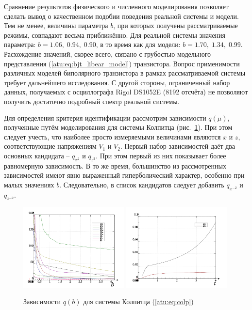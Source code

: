 Сравнение результатов физического и численного моделирования позволяет сделать вывод
о качественном подобии поведения реальной системы и модели.
Тем не менее, величины параметра $b$, при которых получены
рассматриваемые режимы, совпадают весьма приближённо.
Для реальной системы значения параметра: $b = 1.06, \; 0.94, \; 0.90 $, в то время как
для модели: $b = 1.70, \; 1.34, \; 0.99 $.
Расхождение значений, скорее всего, связано с грубостью модельного представления (\ref{atu:eq:bjt_libear_model}) транзистора.
Вопрос применимости различных моделей биполярного транзистора в рамках рассматриваемой системы
требует дальнейшего исследования.
С другой стороны, ограниченный набор данных, получаемых с осциллографа Rigol DS1052E (8192 отсчёта) не позволяют
получить достаточно подробный спектр реальной системы.

Для определения критерия идентификации рассмотрим зависимости
$q(\mu) $, полученные путём моделирования
для системы Колпитца (рис.~\ref{atu:f:colp_q}).
При этом следует учесть, что наиболее просто измеряемыми величинами являются $x$ и $z$,
соответствующие напряжениям $V_1$ и $V_2$.
Первый набор зависимостей даёт два основных кандидата -- $q_{x^2}$ и $q_{z^2}$.
При этом первый из них показывает более равномерную зависимость.
В то же время, большинство из рассмотренных зависимостей имеют явно
выраженный гиперболический характер, особенно при малых значениях $b$.
Следовательно, в список кандидатов следует добавить $q_{x^{-2}} $ и $q_{z^{-2}}$.

\begin{figure}[htb!]
\centerline{
  \includegraphics[width=0.49\textwidth]{p/mod/colp_p-p_b_e.png}
  \includegraphics[width=0.49\textwidth]{p/mod/colp_p-p_b_1ex2.png}
}
  \caption{Зависимости $q(b) $ для системы Колпитца (\ref{atu:eq:colp})}
\label{atu:f:colp_q}
\end{figure}

